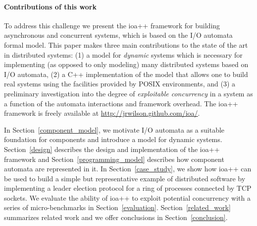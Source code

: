 \paragraph*{Contributions of this work}
To address this challenge we present the ioa++ framework for building asynchronous and concurrent systems, which is based on the I/O automata formal model. 
This paper makes three main contributions to the state of the art in distributed systems:
(1)  a model for \emph{dynamic} systems which is necessary for implementing (as opposed to only modeling) many distributed systems based on I/O automata,
(2)  a C++ implementation of the model that allows one to build real systems using the facilities provided by POSIX environments, and
(3)  a preliminary investigation into the degree of \emph{exploitable concurrency} in a system as a function of the automata interactions and framework overhead.
The ioa++ framework is freely available at \url{http://jrwilson.github.com/ioa/}.

In Section~\ref{component_model}, we motivate I/O automata as a suitable foundation for components and introduce a model for dynamic systems.
Section~\ref{design} describes the design and implementation of the ioa++ framework and Section~\ref{programming_model} describes how component automata are represented in it.
In Section~\ref{case_study}, we show how ioa++ can be used to build a simple but representative example of distributed software by implementing a leader election protocol for a ring of processes connected by TCP sockets.
We evaluate the ability of ioa++ to exploit potential concurrency with a series of micro-benchmarks in Section~\ref{evaluation}.
Section~\ref{related_work} summarizes related work and we offer conclusions in Section~\ref{conclusion}.

